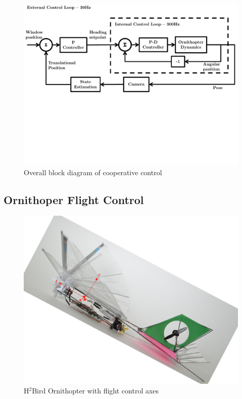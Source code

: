 \documentclass[letterpaper, 10 pt, conference]{ieeeconf}
\begin{document}
\begin{figure}[tb]
\centering
\includegraphics[width=\linewidth]{figures/block_diagrams.pdf}
\caption{Overall block diagram of cooperative control}
\label{fig:block_diagram}
\end{figure}

\subsection{Ornithoper Flight Control}

\begin{figure}[tb]
\centering
\includegraphics[width=\linewidth]{figures/h2bird_axes.jpg}
\caption{H$^2$Bird Ornithopter with flight control axes}
\label{fig:h2Bird_axes}
\end{figure}
\end{document}
